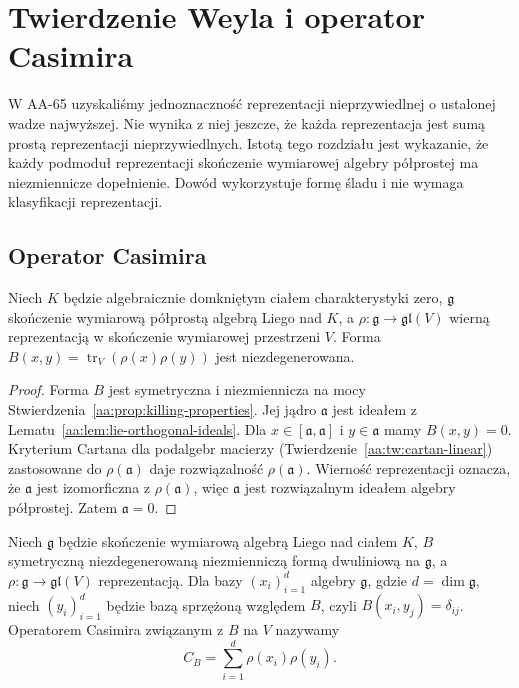 \chapter{Twierdzenie Weyla i operator Casimira}
\label{aa:ch:weyl-complete-reducibility}

W AA-65 uzyskaliśmy jednoznaczność reprezentacji nieprzywiedlnej o ustalonej wadze najwyższej. Nie wynika z niej jeszcze, że każda reprezentacja jest sumą prostą reprezentacji nieprzywiedlnych. Istotą tego rozdziału jest wykazanie, że każdy podmoduł reprezentacji skończenie wymiarowej algebry półprostej ma niezmiennicze dopełnienie. Dowód wykorzystuje formę śladu i nie wymaga klasyfikacji reprezentacji.

\section{Operator Casimira}

\begin{lemat}
\label{aa:lem:lie-faithful-trace}
Niech $K$ będzie algebraicznie domkniętym ciałem charakterystyki zero, $\mathfrak g$ skończenie wymiarową półprostą algebrą Liego nad $K$, a $\rho:\mathfrak g\to\mathfrak{gl}(V)$ wierną reprezentacją w skończenie wymiarowej przestrzeni $V$. Forma $B(x,y)=\operatorname{tr}_V(\rho(x)\rho(y))$ jest niezdegenerowana.
\end{lemat}
\begin{proof}
Forma $B$ jest symetryczna i niezmiennicza na mocy Stwierdzenia~\ref{aa:prop:killing-properties}. Jej jądro $\mathfrak a$ jest ideałem z Lematu~\ref{aa:lem:lie-orthogonal-ideals}. Dla $x\in[\mathfrak a,\mathfrak a]$ i $y\in\mathfrak a$ mamy $B(x,y)=0$. Kryterium Cartana dla podalgebr macierzy (Twierdzenie~\ref{aa:tw:cartan-linear}) zastosowane do $\rho(\mathfrak a)$ daje rozwiązalność $\rho(\mathfrak a)$. Wierność reprezentacji oznacza, że $\mathfrak a$ jest izomorficzna z $\rho(\mathfrak a)$, więc $\mathfrak a$ jest rozwiązalnym ideałem algebry półprostej. Zatem $\mathfrak a=0$.
\end{proof}

\begin{definicja}
\label{aa:def:lie-casimir}
Niech $\mathfrak g$ będzie skończenie wymiarową algebrą Liego nad ciałem $K$, $B$ symetryczną niezdegenerowaną niezmienniczą formą dwuliniową na $\mathfrak g$, a $\rho:\mathfrak g\to\mathfrak{gl}(V)$ reprezentacją. Dla bazy $(x_i)_{i=1}^d$ algebry $\mathfrak g$, gdzie $d=\dim\mathfrak g$, niech $(y_i)_{i=1}^d$ będzie bazą sprzężoną względem $B$, czyli $B(x_i,y_j)=\delta_{ij}$. Operatorem Casimira związanym z $B$ na $V$ nazywamy
\[
 C_B=\sum_{i=1}^d\rho(x_i)\rho(y_i).
\]
\end{definicja}

